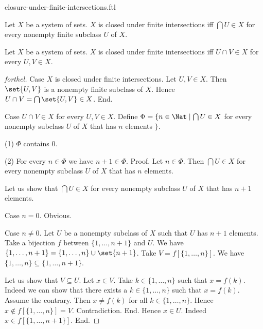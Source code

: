 \documentclass{naproche-library}
\begin{document}
\begin{smodule}[title=Closure Under Finite Intersections]{closure-under-finite-intersections.ftl}

\begin{definition}[forthel,id=FOUNDATIONS_14_4297814324543488]
  Let $X$ be a system of sets.
  $X$ is closed under finite intersections iff $\bigcap U \in X$ for every nonempty finite subclass $U$ of $X$.
\end{definition}

\begin{proposition}[forthel,id=FOUNDATIONS_17_1405012582334464]
  Let $X$ be a system of sets.
  $X$ is closed under finite intersections iff $U \cap V \in X$ for every $U, V \in X$.
\end{proposition}
\begin{proof}[forthel]
  Case $X$ is closed under finite intersections.
    Let $U, V \in X$.
    Then $\set{U, V}$ is a nonempty finite subclass of $X$.
    Hence $U \cap V = \bigcap \set{U, V} \in X$.
  End.

  Case $U \cap V \in X$ for every $U, V \in X$.
    Define $\Phi = \{ n \in \Nat \mid \bigcap U \in X$ for every nonempty subclass $U$ of $X$ that has $n$ elements $\}$.

    (1) $\Phi$ contains $0$.

    (2) For every $n \in \Phi$ we have $n + 1 \in \Phi$. \newline
    Proof.
      Let $n \in \Phi$.
      Then $\bigcap U \in X$ for every nonempty subclass $U$ of $X$ that has $n$ elements.

      Let us show that $\bigcap U \in X$ for every nonempty subclass $U$ of $X$ that has $n + 1$ elements.

        Case $n = 0$. Obvious.

        Case $n \neq 0$.
          Let $U$ be a nonempty subclass of $X$ such that $U$ has $n + 1$ elements.
          Take a bijection $f$ between $\{1, \dots, n + 1 \}$ and $U$.
          We have $\{ 1, \dots, n + 1 \} = \{ 1, \dots, n \} \cup \set{n + 1}$.
          Take $V = f[\{ 1, \dots, n \}]$.
          We have $\{ 1, \dots, n \} \subseteq \{ 1, \dots, n + 1 \}$.

          Let us show that $V \subseteq U$.
            Let $x \in V$.
            Take $k \in \{ 1, \dots, n \}$ such that $x = f(k)$.
            Indeed we can show that there exists a $k \in \{ 1, \dots, n \}$ such that $x = f(k)$.
              Assume the contrary.
              Then $x \neq f(k)$ for all $k \in \{ 1, \dots, n \}$.
              Hence $x \notin f[\{ 1, \dots, n \}] = V$.
              Contradiction.
            End.
            Hence $x \in U$.
            Indeed $x \in f[\{ 1, \dots, n + 1 \}]$.
          End.


\end{proof}
\end{smodule}
\end{document}
